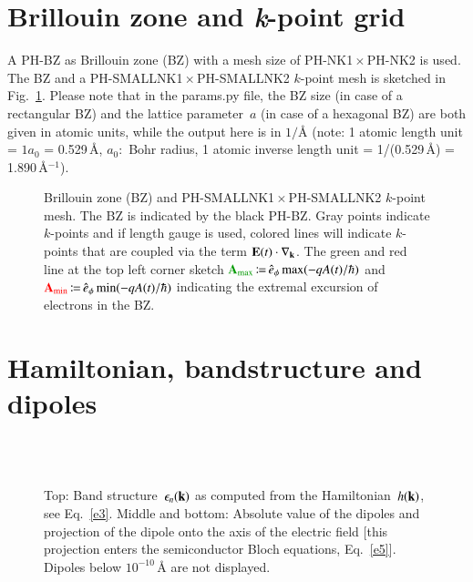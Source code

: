\documentclass[11pt, a4paper]{scrartcl}
\newlength\figureheight
\newlength\figurewidth
\begin{document}
\section{Brillouin zone and \textit{k}-point grid}
A PH-BZ as Brillouin zone (BZ) with a mesh size of PH-NK1\,$\times$\,PH-NK2 is used. 
%
The BZ and a PH-SMALLNK1\,$\times$\,PH-SMALLNK2 $k$-point mesh is sketched in Fig.~\ref{fig:kp}.
%
Please note that in the params.py file, the BZ size (in case of a rectangular BZ) and the lattice parameter~$a$ (in case of a hexagonal BZ) are both given in atomic units, while the output here is in $1/${\AA} (note: 1 atomic length unit = $1 a_0$ = 0.529\,\AA, $a_0$:~Bohr radius, 1 atomic inverse length unit = 1/(0.529\,\AA) = 1.890\,\AA$^{-1}$). 
%
\begin{figure}
\centering
\setlength{} 
\setlength{}

\caption{Brillouin zone (BZ) and PH-SMALLNK1\,$\times$\,PH-SMALLNK2 $k$-point mesh.
%
The BZ is indicated by the black PH-BZ.
%
Gray points indicate $k$-points and if length gauge is used, colored lines will indicate $k$-points that are coupled via  the term $\mathbf{E}(t)\cdot \nabla_{\mathbf{k}}$.
%
The green and red line at the top left corner sketch ${\color{darkgreen}\bA_\text{max}}\coloneqqt\hat{e}_\phi\max (-qA(t)/\hbar)$ and ${\color{red}\mathbf{A}_\text{min}}\,{\coloneqq}\,\hat{e}_\phi\min (-qA(t)/\hbar)$ indicating the extremal excursion of  electrons in the BZ.  
}
    \label{fig:kp}
\end{figure}


\section{Hamiltonian, bandstructure and dipoles}
\begin{figure}
\centering
\setlength\figureheight{6.5cm} 
\setlength\figurewidth{\textwidth}

\\[2em]

\\[2em]

\caption{Top: Band structure~$\epsilon_n(\mathbf{k})$ as computed from the Hamiltonian~$h(\mathbf{k})$, see Eq.~\eqref{e3}. 
%
Middle and bottom: Absolute value of the dipoles and projection of the dipole onto the axis of the electric field [this projection enters the semiconductor Bloch equations, Eq.~\eqref{e5}].
%
Dipoles below $10^{-10}$\,{\AA} are not displayed.
}
    \label{fig:bandstructuredipole}
\end{figure}
\end{document}
